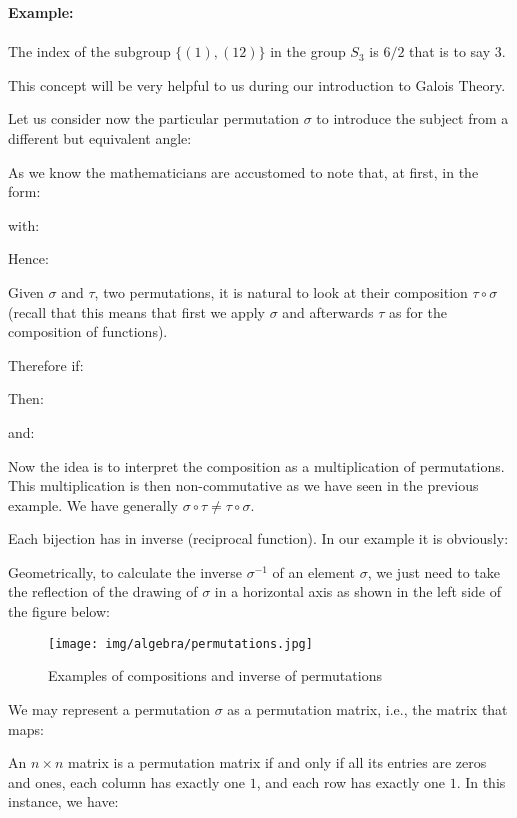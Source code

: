 	\begin{tcolorbox}[colframe=black,colback=white,sharp corners]
	\textbf{{\Large {}}Example:}\\\\
	The index of the subgroup $\{(1), (1 2)\}$ in the group $S_3$ is $6/2$ that is to say $3$.
	\end{tcolorbox}
	 This concept will be very helpful to us during our introduction to Galois Theory.
	
	Let us consider now the particular permutation $\sigma$ to introduce the subject from a different but equivalent angle:
	
	As we know the mathematicians are accustomed to note that, at first, in the form:
	 
	with:
	
	Hence:
	 
	Given $\sigma$ and $\tau$, two permutations, it is natural to look at their composition $\tau\circ \sigma$  (recall that this means that first we apply $\sigma$ and afterwards $\tau$ as for the composition of functions).
	
	Therefore if:
	
	Then:
	
	and:
	
	Now the idea is to interpret the composition as a multiplication of permutations. This multiplication is then non-commutative as we have seen in the previous example. We have generally $\sigma \circ \tau \neq \tau \circ \sigma$.
	
	Each bijection has in inverse (reciprocal function). In our example it is obviously:
	
	Geometrically, to calculate the inverse $\sigma^{-1}$ of an element $\sigma$, we just need to take the reflection of the drawing of $\sigma$ in a horizontal axis as shown in the left side of the figure below:
	\begin{figure}[H]
		\centering
		\texttt{[image: img/algebra/permutations.jpg]}
		\caption{Examples of compositions and inverse of permutations}
	\end{figure}
	We may represent a permutation $\sigma$ as a permutation matrix, i.e., the matrix that maps:
	
	An $n\times n$ matrix is a permutation matrix if and only if all its entries are zeros and ones, each column has exactly one $1$, and each row has exactly one $1$.  In this instance, we have:
	 
